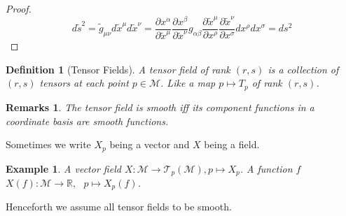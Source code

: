 \documentclass[a4paper]{article}
\newtheorem{eg}{Example}[section]
\newtheorem{remarks}{Remarks}[section]
\theoremstyle{new}
\newtheorem{defi}{Definition}[section]
\begin{document}
\begin{proof}
$$d\tilde{s}^2=\tilde{g}_{\mu\nu}d\tilde{x}^\mu d\tilde{x}^\nu=\frac{\partial x^\alpha}{\partial\tilde{x}^\mu}\frac{\partial x^\beta}{\partial\tilde{x}^\nu}g_{\alpha\beta}\frac{\partial\tilde{x}^\mu}{\partial x^\rho}\frac{\partial\tilde{x}^\nu}{\partial x^\sigma}dx^\rho dx^\sigma=ds^2$$
\end{proof}
\begin{defi}[Tensor Fields]
A tensor field of rank $(r,s)$ is a collection of $(r,s)$ tensors at each point $p\in\mathcal{M}$. Like a map $p\mapsto T_p$ of rank $(r,s)$.
\end{defi}
\begin{remarks}
The tensor field is smooth iff its component functions in a coordinate basis are smooth functions.
\end{remarks}
Sometimes we write $X_p$ being a vector and $X$ being a field.
\begin{eg}
A vector field $X:\mathcal{M}\rightarrow\mathcal{T}_p(\mathcal{M}),p\mapsto X_p$. A function $f$ $X(f):\mathcal{M}\rightarrow\mathbb{R},\text{  }p\mapsto X_p(f)$.
\end{eg}
Henceforth we assume all tensor fields to be smooth.
\end{document}
